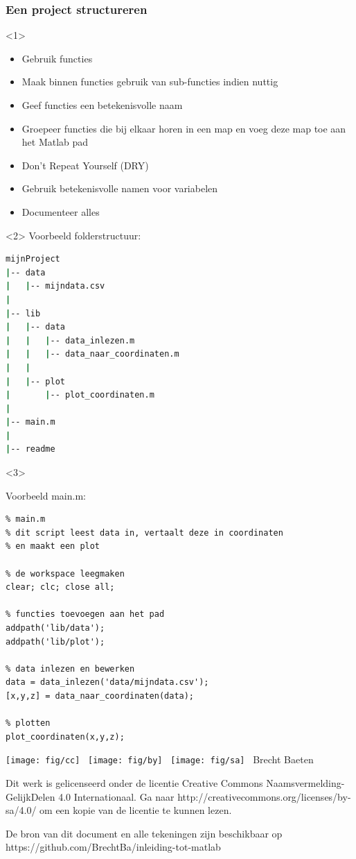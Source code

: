 \documentclass[t]{beamer}
\begin{document}
\begin{frame}[fragile]
	\frametitle{Een project structureren}
\begin{onlyenv}<1>
	\begin{itemize}
		\item Gebruik functies
		\item Maak binnen functies gebruik van sub-functies indien nuttig
		\item Geef functies een betekenisvolle naam
		\item Groepeer functies die bij elkaar horen in een map en voeg deze map toe aan het Matlab pad
		\item Don't Repeat Yourself (DRY)
		\item Gebruik betekenisvolle namen voor variabelen
		\item Documenteer alles
	\end{itemize}
\end{onlyenv}
\begin{onlyenv}<2>
Voorbeeld folderstructuur:

	\begin{lstlisting}[language=bash]
mijnProject	
|-- data
|   |-- mijndata.csv
|
|-- lib
|   |-- data
|   |   |-- data_inlezen.m
|   |   |-- data_naar_coordinaten.m
|   |
|   |-- plot
|       |-- plot_coordinaten.m
|
|-- main.m
|
|-- readme
	\end{lstlisting}
\end{onlyenv}
\begin{onlyenv}<3>

Voorbeeld main.m:
	\begin{lstlisting}
% main.m
% dit script leest data in, vertaalt deze in coordinaten
% en maakt een plot

% de workspace leegmaken
clear; clc; close all;

% functies toevoegen aan het pad
addpath('lib/data');
addpath('lib/plot');

% data inlezen en bewerken
data = data_inlezen('data/mijndata.csv');
[x,y,z] = data_naar_coordinaten(data);

% plotten
plot_coordinaten(x,y,z);
	\end{lstlisting}	
	
\end{onlyenv}
\end{frame}
\begin{frame}
	\footnotesize
	\vspace{4cm}
	\texttt{[image: fig/cc]} \
	\texttt{[image: fig/by]} \
	\texttt{[image: fig/sa]}
	\quad \the\year\ Brecht Baeten
	\vspace{0.5cm}
	
    Dit werk is gelicenseerd onder de licentie Creative Commons Naamsvermelding-GelijkDelen 4.0 Internationaal. Ga naar http://creativecommons.org/licenses/by-sa/4.0/ om een kopie van de licentie te kunnen lezen.
    	
    \vspace{0.5cm}
    De bron van dit document en alle tekeningen zijn beschikbaar op https://github.com/BrechtBa/inleiding-tot-matlab
\end{frame}
\end{document}
